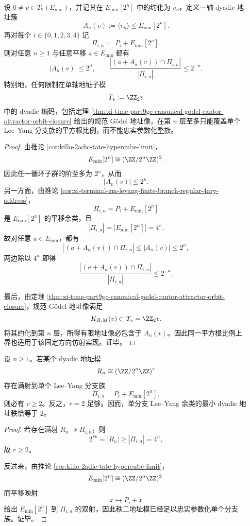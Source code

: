 \begin{theorem}\label{thm:conclusion-leyang-uniaxial-address-square-root-defect}
设 \(0\neq v\in T_2(E_{\min})\)，并记其在
\(
E_{\min}[2^n]
\)
中的约化为 \(v_n\)。定义一轴 dyadic 地址簇
\[
A_n(v):=\langle v_n\rangle\le E_{\min}[2^n].
\]
再对每个 \(i\in\{0,1,2,3,4\}\) 记
\[
\Pi_{i,n}:=P_i+E_{\min}[2^n].
\]
则对任意 \(n\ge 1\) 与任意平移 \(a\in E_{\min}\) 都有
\[
|A_n(v)|\le 2^n,
\qquad
\frac{|(a+A_n(v))\cap \Pi_{i,n}|}{|\Pi_{i,n}|}\le 2^{-n}.
\]
特别地，任何限制在单轴地址子模
\[
T_v:=\ZZ_2v
\]
中的 dyadic 编码，包括定理
\ref{thm:xi-time-part9gc-canonical-godel-cantor-attractor-orbit-closure}
给出的规范 Gödel 地址像，在第 \(n\) 层至多只能覆盖单个 Lee--Yang 分支族的平方根比例，而不能忠实参数化整族。
\end{theorem}
\begin{proof}
由推论 \ref{cor:killo-2adic-tate-hypercube-limit}，
\[
E_{\min}[2^n]\cong (\ZZ/2^n\ZZ)^2.
\]
因此任一循环子群的阶至多为 \(2^n\)，从而
\[
|A_n(v)|\le 2^n.
\]
另一方面，由推论 \ref{cor:xi-terminal-zm-leyang-finite-branch-regular-4ary-address}，
\[
\Pi_{i,n}=P_i+E_{\min}[2^n]
\]
是 \(E_{\min}[2^n]\) 的平移余类，且
\[
|\Pi_{i,n}|=|E_{\min}[2^n]|=4^n.
\]
故对任意 \(a\in E_{\min}\)，都有
\[
|(a+A_n(v))\cap \Pi_{i,n}|
\le
|A_n(v)|
\le
2^n,
\]
两边除以 \(4^n\) 即得
\[
\frac{|(a+A_n(v))\cap \Pi_{i,n}|}{|\Pi_{i,n}|}\le 2^{-n}.
\]

最后，由定理 \ref{thm:xi-time-part9gc-canonical-godel-cantor-attractor-orbit-closure}，规范 Gödel 地址像满足
\[
K_{B,M}(v)\subset T_v=\ZZ_2v.
\]
将其约化到第 \(n\) 层，所得有限地址像必包含于 \(A_n(v)\)。因此同一平方根比例上界也适用于该固定方向仿射实现。证毕。
\end{proof}

\begin{corollary}\label{cor:conclusion-leyang-minimal-dyadic-address-rank-two}
设 \(n\ge 1\)。若某个 dyadic 地址模
\[
R_n\cong (\ZZ/2^n\ZZ)^r
\]
存在满射到单个 Lee--Yang 分支族
\[
\Pi_{i,n}=P_i+E_{\min}[2^n],
\]
则必有 \(r\ge 2\)。反之，\(r=2\) 足够。因而，单分支 Lee--Yang 余类的最小 dyadic 地址秩恰等于 \(2\)。
\end{corollary}
\begin{proof}
若存在满射 \(R_n\twoheadrightarrow \Pi_{i,n}\)，则
\[
2^{rn}=|R_n|\ge |\Pi_{i,n}|=4^n,
\]
故 \(r\ge 2\)。

反过来，由推论 \ref{cor:killo-2adic-tate-hypercube-limit}，
\[
E_{\min}[2^n]\cong (\ZZ/2^n\ZZ)^2.
\]
而平移映射
\[
x\longmapsto P_i+x
\]
给出 \(E_{\min}[2^n]\) 到 \(\Pi_{i,n}\) 的双射，因此秩二地址模已经足以忠实参数化单个分支族。证毕。
\end{proof}

